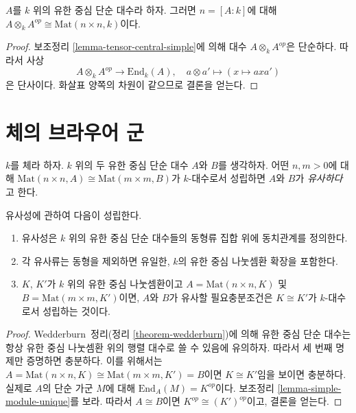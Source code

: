 \begin{lemma}
\label{lemma-inverse}
$A$를 $k$ 위의 유한 중심 단순 대수라 하자. 그러면
$n = [A : k]$에 대해
$A \otimes_k A^{op} \cong \text{Mat}(n \times n, k)$이다.
\end{lemma}

\begin{proof}
보조정리 \ref{lemma-tensor-central-simple}에 의해 대수
$A \otimes_k A^{op}$은 단순하다. 따라서 사상
$$
A \otimes_k A^{op} \longrightarrow \text{End}_k(A),\quad
a \otimes a' \longmapsto (x \mapsto axa')
$$
은 단사이다. 화살표 양쪽의 차원이 같으므로 결론을 얻는다.
\end{proof}





\section{체의 브라우어 군}
\label{section-brauer}

\noindent
$k$를 체라 하자. $k$ 위의 두 유한 중심 단순 대수 $A$와 $B$를 생각하자.
어떤 $n, m > 0$에 대해
$\text{Mat}(n \times n, A) \cong \text{Mat}(m \times m, B)$가
$k$-대수로서 성립하면 $A$와 $B$가 {\it 유사하다}고 한다.

\begin{lemma}
\label{lemma-similar}
유사성에 관하여 다음이 성립한다.
\begin{enumerate}
\item 유사성은 $k$ 위의 유한 중심 단순 대수들의 동형류 집합 위에
동치관계를 정의한다.
\item 각 유사류는 동형을 제외하면 유일한, $k$의 유한 중심 나눗셈환 확장을
포함한다.
\item $K$, $K'$가 $k$ 위의 유한 중심 나눗셈환이고
$A = \text{Mat}(n \times n, K)$ 및 $B = \text{Mat}(m \times m, K')$이면,
$A$와 $B$가 유사할 필요충분조건은 $K \cong K'$가 $k$-대수로서
성립하는 것이다.
\end{enumerate}
\end{lemma}

\begin{proof}
Wedderburn~정리(정리 \ref{theorem-wedderburn})에 의해 유한 중심 단순 대수는
항상 유한 중심 나눗셈환 위의 행렬 대수로 쓸 수 있음에 유의하자.
따라서 세 번째 명제만 증명하면 충분하다. 이를 위해서는
$A = \text{Mat}(n \times n, K) \cong \text{Mat}(m \times m, K') = B$이면
$K \cong K'$임을 보이면 충분하다. 실제로 $A$의 단순 가군 $M$에 대해
$\text{End}_A(M) = K^{op}$이다. 보조정리
\ref{lemma-simple-module-unique}를 보라. 따라서 $A \cong B$이면
$K^{op} \cong (K')^{op}$이고, 결론을 얻는다.
\end{proof}

